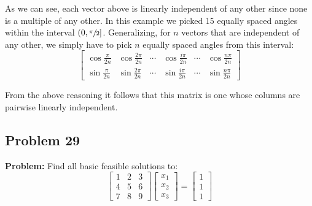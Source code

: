 \documentclass{article}
\begin{document}
As we can see, each vector above is linearly independent of any other since none is a multiple of any other. In this example we picked 15 equally spaced angles within the interval $\left(0,\sfrac{\pi}{2}\right]$. Generalizing, for $n$ vectors that are independent of any other, we simply have to pick $n$ equally spaced angles from this interval:
\begin{equation*}
    \begin{bmatrix}
        \cos\frac{\pi}{2n}&\cos\frac{2\pi}{2n}&\cdots&\cos\frac{i\pi}{2n}&\cdots&\cos\frac{n\pi}{2n}\\
        \sin\frac{\pi}{2n}&\sin\frac{2\pi}{2n}&\cdots&\sin\frac{i\pi}{2n}&\cdots&\sin\frac{n\pi}{2n}
    \end{bmatrix}
\end{equation*}

From the above reasoning it follows that this matrix is one whose columns are pairwise linearly independent.

\subsection*{Problem 29}
\noindent\textbf{Problem:} Find all basic feasible solutions to:
\begin{equation*}
    \begin{bmatrix}
        1&2&3\\4&5&6\\7&8&9
    \end{bmatrix}\begin{bmatrix}
        x_1\\x_2\\x_3
    \end{bmatrix}=\begin{bmatrix}
        1\\1\\1
    \end{bmatrix}
\end{equation*}
\end{document}
